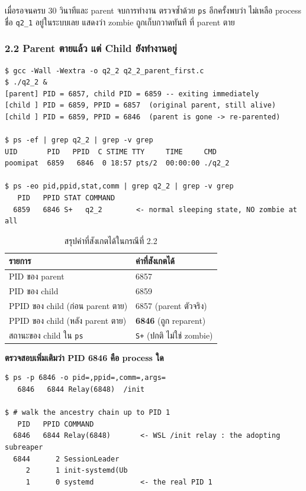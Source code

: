 \documentclass[a4paper,12pt]{article}
\newcommand{\code}[1]{\texttt{#1}}
\begin{document}
เมื่อรอจนครบ 30 วินาทีและ parent จบการทำงาน ตรวจซ้ำด้วย \code{ps} อีกครั้งพบว่า
ไม่เหลือ process ชื่อ \code{q2\_1} อยู่ในระบบเลย แสดงว่า zombie ถูกเก็บกวาดทันที
ที่ parent ตาย

\newpage

\subsubsection{2.2 Parent ตายแล้ว แต่ Child ยังทำงานอยู่}

\begin{lstlisting}[style=terminal,caption={ผลลัพธ์และสถานะจาก \texttt{ps} ในกรณีที่ 2.2}]
$ gcc -Wall -Wextra -o q2_2 q2_2_parent_first.c
$ ./q2_2 &
[parent] PID = 6857, child PID = 6859 -- exiting immediately
[child ] PID = 6859, PPID = 6857  (original parent, still alive)
[child ] PID = 6859, PPID = 6846  (parent is gone -> re-parented)

$ ps -ef | grep q2_2 | grep -v grep
UID       PID   PPID  C STIME TTY     TIME     CMD
poomipat  6859   6846  0 18:57 pts/2  00:00:00 ./q2_2

$ ps -eo pid,ppid,stat,comm | grep q2_2 | grep -v grep
   PID   PPID STAT COMMAND
  6859   6846 S+   q2_2        <- normal sleeping state, NO zombie at all
\end{lstlisting}

\begin{table}[H]
\centering
\caption{สรุปค่าที่สังเกตได้ในกรณีที่ 2.2}
\begin{tabular}{ll}
\toprule
\textbf{รายการ} & \textbf{ค่าที่สังเกตได้} \\
\midrule
PID ของ parent & 6857 \\
PID ของ child & 6859 \\
PPID ของ child (ก่อน parent ตาย) & 6857 \quad (parent ตัวจริง) \\
PPID ของ child (หลัง parent ตาย) & \textbf{6846} \quad (ถูก reparent) \\
สถานะของ child ใน \code{ps} & \code{S+} (ปกติ ไม่ใช่ zombie) \\
\bottomrule
\end{tabular}
\end{table}

\textbf{ตรวจสอบเพิ่มเติมว่า PID 6846 คือ process ใด}

\begin{lstlisting}[style=terminal,caption={สายบรรพบุรุษของ process ที่รับ orphan ไปดูแล}]
$ ps -p 6846 -o pid=,ppid=,comm=,args=
   6846   6844 Relay(6848)  /init

$ # walk the ancestry chain up to PID 1
   PID   PPID COMMAND
  6846   6844 Relay(6848)       <- WSL /init relay : the adopting subreaper
  6844      2 SessionLeader
     2      1 init-systemd(Ub
     1      0 systemd           <- the real PID 1
\end{lstlisting}
\end{document}
